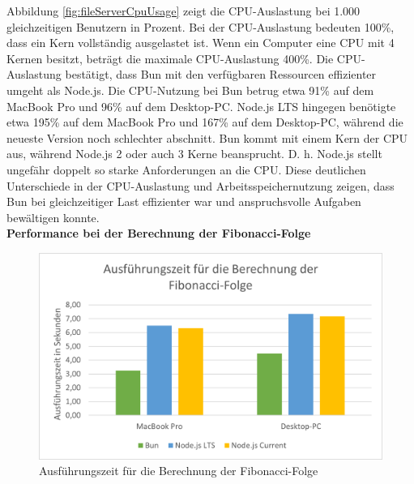 \noindent
Abbildung \ref{fig:fileServerCpuUsage} zeigt die CPU-Auslastung bei 1.000 gleichzeitigen Benutzern in Prozent. Bei der CPU-Auslastung bedeuten 100\%, dass ein Kern vollständig ausgelastet ist. Wenn ein Computer eine CPU mit 4 Kernen besitzt, beträgt die maximale CPU-Auslastung 400\%. Die CPU-Auslastung bestätigt, dass Bun mit den verfügbaren Ressourcen effizienter umgeht als Node.js. Die CPU-Nutzung bei Bun betrug etwa 91\% auf dem MacBook Pro und 96\% auf dem Desktop-PC. Node.js LTS hingegen benötigte etwa 195\% auf dem MacBook Pro und 167\% auf dem Desktop-PC, während die neueste Version noch schlechter abschnitt. Bun kommt mit einem Kern der CPU aus, während Node.js 2 oder auch 3 Kerne beansprucht. D. h. Node.js stellt ungefähr doppelt so starke Anforderungen an die CPU. Diese deutlichen Unterschiede in der CPU-Auslastung und Arbeitsspeichernutzung zeigen, dass Bun bei gleichzeitiger Last effizienter war und anspruchsvolle Aufgaben bewältigen konnte.\\

\noindent
\textbf{Performance bei der Berechnung der Fibonacci-Folge}
\begin{figure}[h!]
	\centering
	\includegraphics[width=\linewidth]{./images/fibonacciRuntime.png}
	\caption{Ausführungszeit für die Berechnung der Fibonacci-Folge}
	\label{fig:fibonacciRuntime}
\end{figure}


